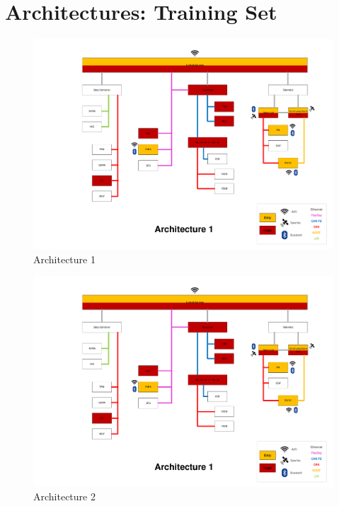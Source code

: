 \chapter{Architectures: Training Set}
\label{apx:surveyarch}

\begin{figure}[h]
    \centering
    \includegraphics[width=\textwidth, page=1]{../Architectures-survey.pdf}
    \caption{Architecture 1}
    \label{fig:architecture1}
\end{figure}

\begin{figure}[h]
    \centering
    \includegraphics[width=\textwidth, page=2]{../Architectures-survey.pdf}
    \caption{Architecture 2}
    \label{fig:architecture2}
\end{figure}


